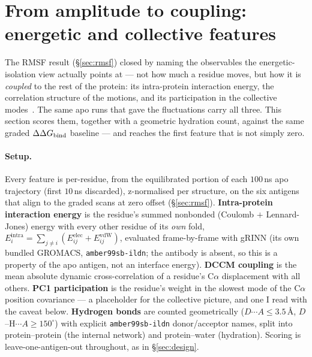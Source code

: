 \section{From amplitude to coupling: energetic and collective features}\label{sec:energetics}

The RMSF result (\S\ref{sec:rmsf}) closed by naming the observables the energetic-isolation view
actually points at --- not how much a residue moves, but how it is \emph{coupled} to the rest of the
protein: its intra-protein interaction energy, the correlation structure of the motions, and its
participation in the collective modes~\cite{serapian2020}. The same apo runs that gave the fluctuations
carry all three. This section scores them, together with a geometric hydration count, against the same
graded $\Delta\Delta G_{\mathrm{bind}}$ baseline --- and reaches the first feature that is not simply zero.

\paragraph{Setup.} Every feature is per-residue, from the equilibrated portion of each $100$\,ns apo
trajectory (first $10$\,ns discarded), z-normalised per structure, on the six antigens that align to the
graded scans at zero offset (\S\ref{sec:rmsf}). \textbf{Intra-protein interaction energy} is the
residue's summed nonbonded (Coulomb $+$ Lennard-Jones) energy with every other residue of its
\emph{own} fold, $E_i^{\mathrm{intra}}=\sum_{j\neq i}(E^{\mathrm{elec}}_{ij}+E^{\mathrm{vdW}}_{ij})$,
evaluated frame-by-frame with gRINN (its own bundled GROMACS, \texttt{amber99sb-ildn}; the antibody is
absent, so this is a property of the apo antigen, not an interface energy). \textbf{DCCM coupling} is the
mean absolute dynamic cross-correlation of a residue's C$\alpha$ displacement with all others.
\textbf{PC1 participation} is the residue's weight in the slowest mode of the C$\alpha$ position
covariance --- a placeholder for the collective picture, and one I read with the caveat below.
\textbf{Hydrogen bonds} are counted geometrically ($D\cdots A\leq3.5$\,\AA, $D$--$\mathrm{H}\cdots A\geq
150^{\circ}$) with explicit \texttt{amber99sb-ildn} donor/acceptor names, split into protein--protein
(the internal network) and protein--water (hydration). Scoring is leave-one-antigen-out throughout, as
in \S\ref{sec:design}.


